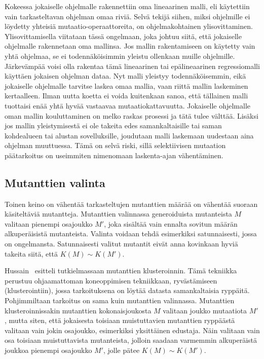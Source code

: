 \documentclass[finnish]{tktltiki2}
\begin{document}
Kokeessa jokaiselle ohjelmalle rakennettiin oma lineaarinen malli, eli käytettiin vain tarkasteltavan ohjelman omaa riviä. Selvä tekijä siihen, miksi ohjelmille ei löydetty yhteisiä mutaatio-operaattoreita, on ohjelmakohtainen ylisovittaminen. Ylisovittamisella viitataan tässä ongelmaan, joka johtuu siitä, että jokaiselle ohjelmalle rakennetaan oma mallinsa. Jos mallin rakentamiseen on käytetty vain yhtä ohjelmaa, se ei todennäköisimmin yleistu ollenkaan muille ohjelmille. Järkevämpää voisi olla rakentaa tämä lineaarinen tai epälineaarinen regressiomalli käyttäen jokaisen ohjelman dataa. Nyt malli yleistyy todennäköisemmin, eikä jokaiselle ohjelmalle tarvitse laskea omaa mallia, vaan riittä mallin laskeminen kertaalleen. Ilman uutta koetta ei voida kuitenkaan sanoa, että tällainen malli tuottaisi enää yhtä hyvää vastaavaa mutaatiokattavuutta. Jokaiselle ohjelmalle oman mallin kouluttaminen on melko raskas prosessi ja tätä tulee välttää. Lisäksi jos mallin yleistymisestä ei ole takeita edes samankaltaisille tai saman kohdealueen tai alustan sovelluksille, joudutaan malli laskemaan uudestaan aina ohjelman muuttuessa. Tämä on selvä riski, sillä selektiivisen mutaation päätarkoitus on useimmiten nimenomaan laskenta-ajan vähentäminen.

\subsection{Mutanttien valinta}
Toinen keino on vähentää tarkasteltujen mutanttien määrää on vähentää suoraan käsiteltäviä mutantteja. Mutanttien valinnassa generoiduista mutanteista $M$ valitaan pienempi osajoukko $M'$, joka sisältää vain ennalta sovitun määrän alkuperäisistä mutanteista. Valinta voidaan tehdä esimerkiksi satunnaisesti, jossa on ongelmansta. Satunnaisesti valitut mutantit eivät anna kovinkaan hyviä takeita siitä, että $K(M) \sim K(M')$. 

Hussain~\cite{Hussain08} esitteli tutkielmassaan mutanttien klusteroinnin. Tämä tekniikka perustuu ohjaamattoman koneoppimisen tekniikkaan, ryvästämiseen (klusterointiin), jossa tarkoituksena on löytää datasta samankaltaisia ryppäitä. Pohjimmiltaan tarkoitus on sama kuin mutanttien valinnassa. Mutanttien klusteroinnissakin mutanttien kokonaisjoukosta $M$ valitaan joukko mutaatiota $M'$, mutta siten, että jokaisesta toisiaan muistuttavien mutanttien ryppäästä valitaan vain jokin osajoukko, esimerkiksi yksittäinen edustaja. Näin valitaan vain osa toisiaan muistuttavista mutanteista, jolloin saadaan varmemmin alkuperäistä joukkoa pienempi osajoukko $M'$, jolle pätee $K(M) \sim K(M')$. 
\end{document}

